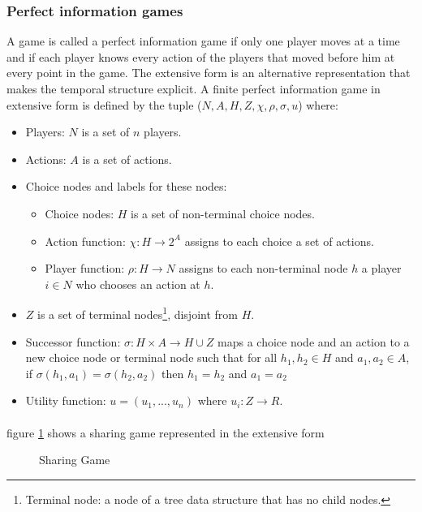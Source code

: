 \subsubsection{Perfect information games}
A game is called a perfect information game if only one player moves at a time and if each player knows every action of the players that moved before him at every point in the game.
The extensive form is an alternative representation that makes the temporal structure explicit. A finite perfect information game in extensive form is defined by the tuple ($N, A, H, Z,\chi ,\rho, \sigma, u $)
where:
\begin{itemize}
\item{Players: $N$ is a set of $n$ players.}
\item{Actions: $A$ is a set of actions.}
\item{Choice nodes and labels for these nodes: }
\begin{itemize}
\item{Choice nodes: $H$ is a set of non-terminal choice nodes.}
\item{Action function: $\chi : H \to 2^A $ assigns to each choice a set of actions.}
\item{Player function: $\rho : H \to N$ assigns to each non-terminal node $h$ a player $i \in N$ who chooses an action at $h$.}
\end{itemize}
\item{$Z$ is a set of terminal nodes\footnote{Terminal node: a node of a tree data structure that has no child nodes.}, disjoint from $H$.}
\item{Successor function: $\sigma : H \times A \to H \cup Z$ maps a choice node and an action to a new choice node or terminal node such that for all $h_1, h_2 \in H$ and $a_1, a_2 \in A$, if $\sigma(h_1, a_1) = \sigma(h_2, a_2)$ then $h_1  = h_2$  and $a_1 = a_2$} 
\item{Utility function: $u = (u_1,...,u_n)$ where $u_i : Z \to R$.
}
\end{itemize} 
\paragraph{}figure \ref{fig:scaled_diss} shows a sharing game represented in the extensive form
\begin{figure}[h]
 
  \centering
  \caption{Sharing Game\label{fig:scaled_diss}}
\end{figure}

